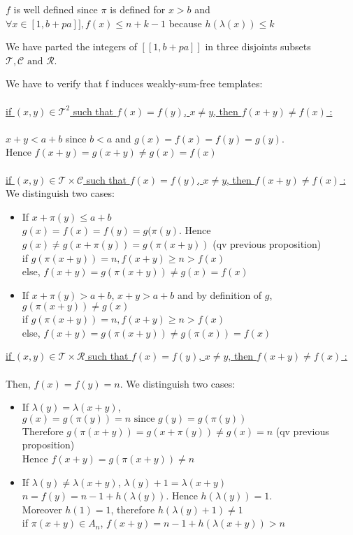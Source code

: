 \(f\) is well defined since \(\pi\) is defined for \(x>b\) and \(\forall x \in \![1,b+pa]\!], f(x)\leqslant n+k-1\) because \(h(\lambda(x))\leqslant k\)

We have parted the integers of \([\![1,b+pa]\!]\) in three disjoints subsets \(\mathcal{T},\mathcal{C} \text{ and } \mathcal{R}\).

We have to verify that f induces weakly-sum-free templates:\\
\\
\underline{if \((x,y) \in \mathcal{T}^2\) such that \(f(x)=f(y)\), \(x \neq y\), then \(f(x+y)\neq f(x)\)  :}\\
\\\(x+y<a+b\) since \(b<a\) and \(g(x)=f(x)=f(y)=g(y)\).
\\Hence \(f(x+y)=g(x+y)\neq g(x)=f(x)\)
\\\\
\underline{if \((x,y) \in \mathcal{T} \times \mathcal{C}\) such that \(f(x)=f(y)\), \(x \neq y\), then \(f(x+y)\neq f(x)\)  :}\\
We distinguish two cases:


\begin{itemize}
\item If \(x+\pi(y)\leqslant a+b\)
\\\(g(x)=f(x)=f(y)=g(\pi(y)\). Hence \(g(x)\neq g(x+\pi(y))=g(\pi(x+y))\) (qv previous proposition)
\\if \(g(\pi(x+y))=n, f(x+y)\geqslant n > f(x)\)
\\else, \(f(x+y)=g(\pi(x+y))\neq g(x)=f(x)\)
\item If \(x+\pi(y)> a+b\), \(x+y>a+b\) and by definition of \(g\), \(g(\pi(x+y))\neq g(x)\)
\\if \(g(\pi(x+y))=n, f(x+y)\geqslant n > f(x)\)
\\else, \(f(x+y)=g(\pi(x+y))\neq g(\pi(x))=f(x)\)
\end{itemize}


\underline{if \((x,y) \in \mathcal{T} \times \mathcal{R}\) such that \(f(x)=f(y)\), \(x \neq y\), then \(f(x+y)\neq f(x)\)  :}\\
\\Then, \(f(x)=f(y)=n\). We distinguish two cases:


\begin{itemize}
\item If \(\lambda(y)=\lambda(x+y)\),
\\\(g(x)=g(\pi(y))=n \text{ since } g(y)=g(\pi(y))\)
\\Therefore \(g(\pi(x+y))=g(x+\pi(y)) \neq g(x)=n\) (qv previous proposition)
\\Hence \(f(x+y)=g(\pi(x+y))\neq n\)
\item If  \(\lambda(y)\neq \lambda(x+y)\), \(\lambda(y)+1= \lambda(x+y)\)\\
\(n=f(y)=n-1+h(\lambda(y))\). Hence \(h(\lambda(y))=1\).
\\Moreover \(h(1)=1\), therefore \(h(\lambda(y)+1) \neq 1\)
\\if \(\pi(x+y) \in A_n\), \(f(x+y)=n-1+h(\lambda(x+y))>n\)
\end{itemize}

